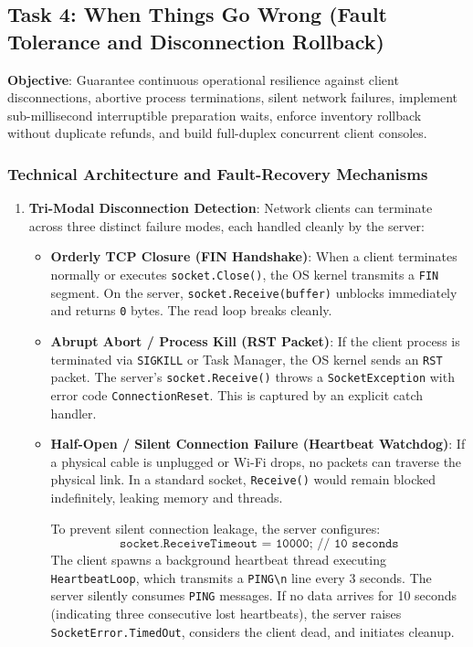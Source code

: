 \documentclass[11pt,a4paper]{article}
\begin{document}
\subsection{Task 4: When Things Go Wrong (Fault Tolerance and Disconnection Rollback)}
\textbf{Objective}: Guarantee continuous operational resilience against client disconnections, abortive process terminations, silent network failures, implement sub-millisecond interruptible preparation waits, enforce inventory rollback without duplicate refunds, and build full-duplex concurrent client consoles.

\subsubsection{Technical Architecture and Fault-Recovery Mechanisms}
\begin{enumerate}
    \item \textbf{Tri-Modal Disconnection Detection}:
    Network clients can terminate across three distinct failure modes, each handled cleanly by the server:
    \begin{itemize}
        \item \textbf{Orderly TCP Closure (FIN Handshake)}: When a client terminates normally or executes \texttt{socket.Close()}, the OS kernel transmits a \texttt{FIN} segment. On the server, \texttt{socket.Receive(buffer)} unblocks immediately and returns \texttt{0} bytes. The read loop breaks cleanly.
        \item \textbf{Abrupt Abort / Process Kill (RST Packet)}: If the client process is terminated via \texttt{SIGKILL} or Task Manager, the OS kernel sends an \texttt{RST} packet. The server's \texttt{socket.Receive()} throws a \texttt{SocketException} with error code \texttt{ConnectionReset}. This is captured by an explicit catch handler.
        \item \textbf{Half-Open / Silent Connection Failure (Heartbeat Watchdog)}: If a physical cable is unplugged or Wi-Fi drops, no packets can traverse the physical link. In a standard socket, \texttt{Receive()} would remain blocked indefinitely, leaking memory and threads. 
        
        To prevent silent connection leakage, the server configures:
        $$\texttt{socket.ReceiveTimeout = 10000; // 10 seconds}$$
        The client spawns a background heartbeat thread executing \texttt{HeartbeatLoop}, which transmits a \texttt{PING\textbackslash n} line every 3 seconds. The server silently consumes \texttt{PING} messages. If no data arrives for 10 seconds (indicating three consecutive lost heartbeats), the server raises \texttt{SocketError.TimedOut}, considers the client dead, and initiates cleanup.
    \end{itemize}


\end{enumerate}
\end{document}
